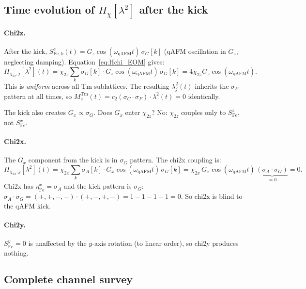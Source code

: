 \documentclass[11pt,a4paper]{article}
\newcommand{\sF}{\sigma_F}
\newcommand{\sG}{\sigma_G}
\newcommand{\sA}{\sigma_A}
\newcommand{\sC}{\sigma_C}
\newcommand{\etax}{\eta^x}
\newcommand{\Mz}{M_z^{\mathrm{Tm}}}
\newcommand{\lamt}{\lambda^2}
\newcommand{\qAFM}{\mathrm{qAFM}}
\begin{document}
\subsection{Time evolution of \boldmath$H_\chi[\lamt]$ after the kick}

\paragraph{Chi2z.}
After the kick, $S^z_{\mathrm{Fe},k}(t) = G_z\cos(\omega_{\qAFM} t)\,\sG[k]$
(qAFM oscillation in $G_z$, neglecting damping).  Equation~\eqref{eq:Hchi_EOM}
gives:
\begin{equation}
  H_{\chi_{2z},j}[\lamt](t)
    = \chi_{2z}\sum_k \sG[k]\cdot G_z\cos(\omega_{\qAFM} t)\,\sG[k]
    = 4\chi_{2z}G_z\cos(\omega_{\qAFM} t).
  \label{eq:H2z_dyn}
\end{equation}
This is \emph{uniform} across all Tm sublattices.  The resulting $\lamt_j(t)$
inherits the $\sF$ pattern at all times, so $\Mz(t)=c_2(\sC\cdot\sF)\cdot
\lamt(t) = 0$ identically.

The kick also creates $G_x \propto \sG$.  Does $G_x$ enter $\chi_{2z}$?
No: $\chi_{2z}$ couples only to $S^z_{\mathrm{Fe}}$, not $S^x_{\mathrm{Fe}}$.

\paragraph{Chi2x.}
The $G_x$ component from the kick is in $\sG$ pattern.  The chi2x coupling is:
\begin{equation}
  H_{\chi_{2x},j}[\lamt](t)
    = \chi_{2x}\sum_k \sA[k]\cdot G_x\cos(\omega_{\qAFM} t)\,\sG[k]
    = \chi_{2x}\,G_x\cos(\omega_{\qAFM} t)\,\underbrace{(\sA\cdot\sG)}_{=0} = 0.
  \label{eq:H2x_dyn}
\end{equation}
Chi2x has $\etax_{\mathrm{Fe}} = \sA$ and the kick pattern is $\sG$:
$\sA\cdot\sG = (+,+,-,-)\cdot(+,-,+,-) = 1-1-1+1 = 0$.
So chi2x is blind to the qAFM kick.

\paragraph{Chi2y.}
$S^y_{\mathrm{Fe}} = 0$ is unaffected by the $y$-axis rotation (to linear order),
so chi2y produces nothing.

\subsection{Complete channel survey}
\end{document}
